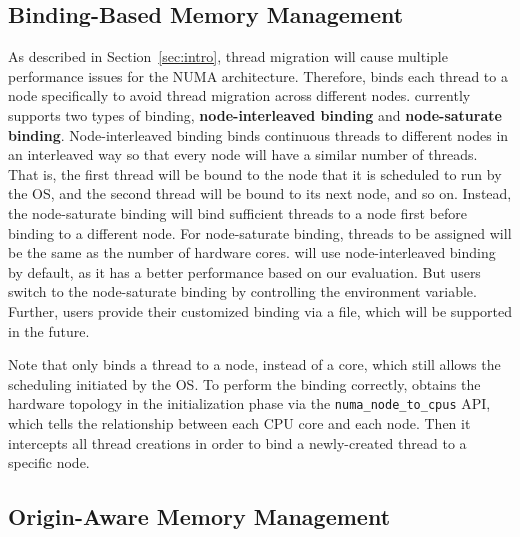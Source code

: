 \subsection{Binding-Based Memory Management} 
\label{sec:balance}
As described in Section~\ref{sec:intro}, thread migration will cause multiple performance issues for the NUMA architecture. Therefore, \NM{} binds each thread to a node specifically to avoid thread migration across different nodes.  \NM{} currently supports two types of binding, \textbf{node-interleaved binding} and \textbf{node-saturate binding}. Node-interleaved binding binds continuous threads to different nodes in an interleaved way so that every node will have a similar number of threads. That is, the first thread will be bound to the node that it is scheduled to run by the OS, and the second thread will be bound to its next node, and so on. Instead, the node-saturate binding will bind sufficient threads to a node first before binding to a different node. For node-saturate binding, threads to be assigned will be the same as the number of hardware cores.  \NM{} will use node-interleaved binding by default, as it has a better performance based on our evaluation. But users  switch to the node-saturate binding by controlling the environment variable. Further, users  provide their customized binding via a file, which will be supported in the future. 

Note that \NM{} only binds a thread to a node, instead of a core, which still allows the scheduling initiated by the OS. To perform the binding correctly, \NM{} obtains the hardware topology in the initialization phase via the \texttt{numa\_node\_to\_cpus} API, which tells the relationship between each CPU core and each 
node. Then it intercepts all thread creations in order to bind a newly-created thread to a specific node.

\subsection{Origin-Aware Memory Management} 
\label{sec:origin}



